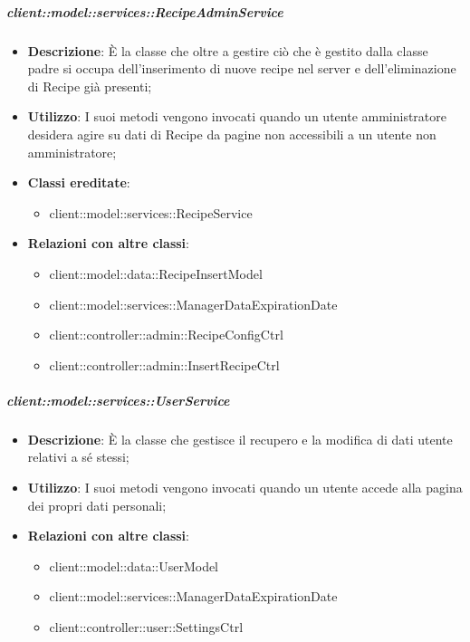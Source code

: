 		\subparagraph{client::model::services::RecipeAdminService} %
		\label{subp:client_model_services_recipeadminservice}
			\begin{itemize}
				\item \textbf{Descrizione}: È la classe che oltre a gestire ciò che è gestito dalla classe padre si occupa dell'inserimento di nuove recipe nel server e dell'eliminazione di Recipe già presenti;
				\item \textbf{Utilizzo}: I suoi metodi vengono invocati quando un utente amministratore desidera agire su dati di Recipe da pagine non accessibili a un utente non amministratore;
				\item \textbf{Classi ereditate}:
					\begin{itemize}
						\item client::model::services::RecipeService
					\end{itemize}
				\item \textbf{Relazioni con altre classi}:
					\begin{itemize}
						\item client::model::data::RecipeInsertModel
						\item client::model::services::ManagerDataExpirationDate
						\item client::controller::admin::RecipeConfigCtrl
						\item client::controller::admin::InsertRecipeCtrl
					\end{itemize}
			\end{itemize}


		\subparagraph{client::model::services::UserService} %
		\label{subp:client_model_services_userservice}
			\begin{itemize}
				\item \textbf{Descrizione}: È la classe che gestisce il recupero e la modifica di dati utente relativi a sé stessi;
				\item \textbf{Utilizzo}: I suoi metodi vengono invocati quando un utente accede alla pagina dei propri dati personali;
				\item \textbf{Relazioni con altre classi}:
					\begin{itemize}
						\item client::model::data::UserModel
						\item client::model::services::ManagerDataExpirationDate
						\item client::controller::user::SettingsCtrl
					\end{itemize}
			\end{itemize}

